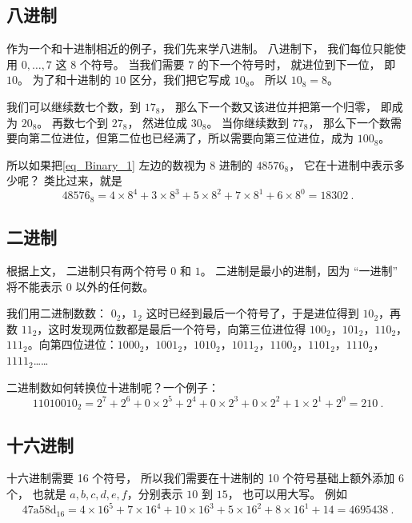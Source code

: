 \subsection{八进制}
作为一个和十进制相近的例子，我们先来学八进制。 八进制下， 我们每位只能使用 $0,\dots,7$ 这 $8$ 个符号。 当我们需要 $7$ 的下一个符号时， 就进位到下一位， 即 $10$。 为了和十进制的 $10$ 区分，我们把它写成 $10_\text{8}$。 所以 $10_\text{8} = 8$。

我们可以继续数七个数，到 $17_\text{8}$， 那么下一个数又该进位并把第一个归零， 即成为 $20_\text{8}$。 再数七个到 $27_\text{8}$， 然进位成 $30_\text{8}$。 当你继续数到 $77_\text{8}$， 那么下一个数需要向第二位进位，但第二位也已经满了，所以需要向第三位进位，成为 $100_\text{8}$。

所以如果把\autoref{eq_Binary_1} 左边的数视为 $8$ 进制的 $48576_\text{8}$， 它在十进制中表示多少呢？ 类比过来，就是
\begin{equation}
48576_\text{8} = 4\times 8^{4} + 3\times 8^{3} + 5\times 8^{2} + 7\times 8^1 + 6\times 8^0 = 18302~.
\end{equation}

\subsection{二进制}
根据上文， 二进制只有两个符号 $0$ 和 $1$。 二进制是最小的进制，因为 “一进制” 将不能表示 $0$ 以外的任何数。

我们用二进制数数： $0_\text{2}$，$1_\text{2}$ 这时已经到最后一个符号了，于是进位得到 $10_\text{2}$，再数 $11_\text{2}$，这时发现两位数都是最后一个符号，向第三位进位得 $100_\text{2}$，$101_\text{2}$，$110_\text{2}$，$111_\text{2}$。向第四位进位：$1000_\text{2}$，$1001_\text{2}$，$1010_\text{2}$，$1011_\text{2}$，$1100_\text{2}$，$1101_\text{2}$，$1110_\text{2}$，$1111_\text{2}$……

二进制数如何转换位十进制呢？一个例子：
\begin{equation}
11010010_\text{2} = 2^7 + 2^6 + 0\times 2^5 + 2^4 + 0\times 2^3 + 0 \times 2^2 + 1\times 2^1 + 2^0 = 210~.
\end{equation}


\subsection{十六进制}
十六进制需要 16 个符号， 所以我们需要在十进制的 10 个符号基础上额外添加 6 个， 也就是 $a,b,c,d,e,f$，分别表示 $10$ 到 $15$， 也可以用大写。 例如
\begin{equation}
\mathrm{47a58d}_\text{16} = 4\times 16^5 + 7\times 16^4 + 10\times 16^3 + 5\times 16^2 + 8 \times 16^1 + 14 = 4695438~.
\end{equation}


